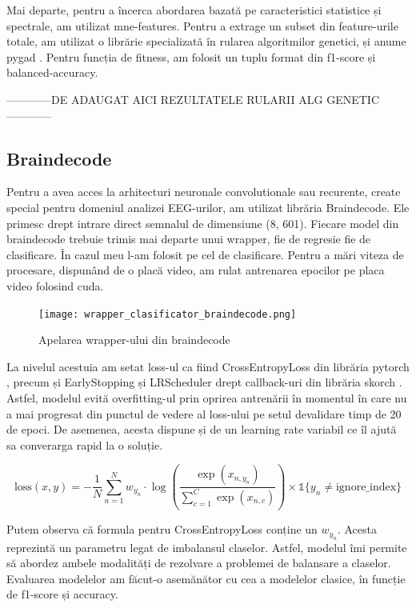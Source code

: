 Mai departe, pentru a încerca abordarea bazată pe caracteristici statistice și spectrale, am utilizat mne-features. Pentru a extrage un subset din feature-urile totale, am utilizat o librărie specializată în rularea algoritmilor genetici, și anume pygad \cite{pygad}. Pentru funcția de fitness, am folosit un tuplu format din f1-score și balanced-accuracy.

------------DE ADAUGAT AICI REZULTATELE RULARII ALG GENETIC------------

\subsection{Braindecode}
Pentru a avea acces la arhitecturi neuronale convolutionale sau recurente, create special pentru domeniul analizei EEG-urilor, am utilizat librăria Braindecode. Ele primesc drept intrare direct semnalul de dimensiune (8, 601). Fiecare model din braindecode trebuie trimis mai departe unui wrapper, fie de regresie fie de clasificare. În cazul meu l-am folosit pe cel de clasificare. Pentru a mări viteza de procesare, dispunând de o placă video, am rulat antrenarea epocilor pe placa video folosind cuda.

\vspace{1em}
\begin{figure}[h]
    \centering
    \texttt{[image: wrapper\_clasificator\_braindecode.png]}
    \caption{Apelarea wrapper-ului din braindecode}
    \label{fig:enter-label}
\end{figure}

La nivelul acestuia am setat loss-ul ca fiind CrossEntropyLoss din librăria pytorch \cite{pytorch}, precum și EarlyStopping și LRScheduler drept callback-uri din librăria skorch \cite{skorch}. Astfel, modelul evită overfitting-ul prin oprirea antrenării în momentul în care nu a mai progresat din punctul de vedere al loss-ului pe setul devalidare timp de 20 de epoci. De asemenea, acesta dispune și de un learning rate variabil ce îl ajută sa converarga rapid la o soluție. 

\begin{equation}
    \text{loss}(x, y) = -\frac{1}{N} \sum_{n=1}^{N} w_{y_n} \cdot \log\left(\frac{\exp(x_{n,y_n})}{\sum_{c=1}^{C} \exp(x_{n,c})}\right) \times \mathbb{1}\{y_n \neq \text{ignore\_index}\}
\end{equation}

Putem observa că formula pentru CrossEntropyLoss conține un \(w_{y_n}\). Acesta reprezintă un parametru legat de imbalansul claselor. Astfel, modelul îmi permite să abordez ambele modalități de rezolvare a problemei de balansare a claselor. Evaluarea modelelor am făcut-o asemănător cu cea a modelelor clasice, în funcție de f1-score și accuracy.

